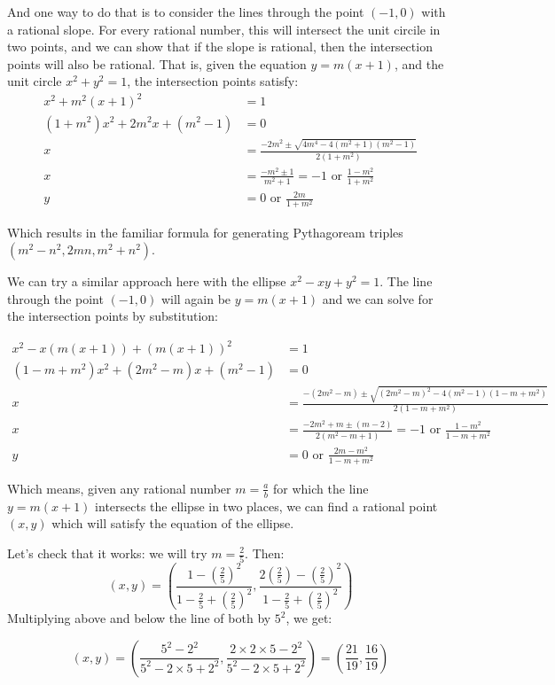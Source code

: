 \documentclass{article}
\begin{document}
And one way to do that is to consider the lines through the point $(-1,0)$ with a rational
slope. For every rational number, this will intersect the unit circile in two points, and we
can show that if the slope is rational, then the intersection points will also be rational.
That is, given the equation $y = m(x+1)$, and the unit circle $x^2+y^2=1$, the intersection
points satisfy:
\begin{align*}
	x^2+m^2(x+1)^2 &= 1 \\
	(1+m^2)x^2 +2m^2x +(m^2-1) &= 0 \\
	x &= \frac{-2m^2 \pm \sqrt{4m^4 -4(m^2+1)(m^2-1)}}{2(1+m^2)} \\
	x &= \frac{-m^2 \pm 1}{m^2+1} = -1 \text{ or } \frac{1-m^2}{1+m^2} \\
	y &= 0 \text{ or } \frac{2m}{1+m^2} 
\end{align*}

Which results in the familiar formula for generating Pythagoream triples $(m^2-n^2, 2mn, m^2+n^2)$.

We can try a similar approach here with the ellipse $x^2-xy+y^2=1$. The line through the point 
$(-1,0)$ will again be $y = m(x+1)$ and we can solve for the intersection points by substitution:

\begin{align*}
	x^2 - x(m(x+1)) + (m(x+1))^2 &= 1 \\
	(1-m+m^2)x^2 +(2m^2-m)x +(m^2-1) &= 0 \\
	x &= \frac{-(2m^2-m) \pm \sqrt{(2m^2-m)^2 -4(m^2-1)(1-m+m^2)}}{2(1-m+m^2)} \\
	x &= \frac{-2m^2 +m \pm (m-2)}{2(m^2-m+1)} = -1 \text{ or } \frac{1-m^2}{1-m+m^2} \\
	y &= 0 \text{ or } \frac{2m-m^2}{1-m+m^2} 
\end{align*}

Which means, given any rational number $m=\frac{a}{b}$ for which the line $y=m(x+1)$ intersects
the ellipse in two places, we can find a rational point $(x,y)$ which will satisfy the equation
of the ellipse.

Let's check that it works: we will try $m=\frac{2}{5}$. Then:
\[ (x,y) = \left(\frac{1 - (\frac{2}{5})^2}{1-\frac{2}{5} + (\frac{2}{5})^2}, 
\frac{2(\frac{2}{5}) - (\frac{2}{5})^2}{1-\frac{2}{5} + (\frac{2}{5})^2} \right)\]
Multiplying above and below the line of both by $5^2$, we get:

\[ (x,y) = (\frac{5^2 - 2^2}{5^2- 2\times5 + 2^2}, 
\frac{2\times2\times5 - 2^2}{5^2 - 2\times5 + 2^2}) = (\frac{21}{19},\frac{16}{19}) \]
\end{document}
